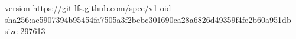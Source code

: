 version https://git-lfs.github.com/spec/v1
oid sha256:ac5907394b95454fa7505a3f2bcbc301690ca28a6826d49359f4fe2b60a951db
size 297613
